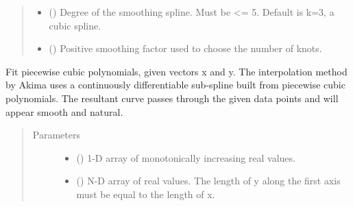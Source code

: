 \documentclass[letterpaper,10pt,english,openany, oneside]{sphinxmanual}
\begin{document}
\begin{fulllineitems}
\begin{quote}
\begin{description}
\begin{itemize}
\item {} 
 () \textendash{} Degree of the smoothing spline. Must be \textless{}= 5.
Default is k=3, a cubic spline.

\item {} 
 () \textendash{} Positive smoothing factor used to choose the number of knots.

\end{itemize}

\end{description}\end{quote}

\begin{fulllineitems}
\label{\detokenize{index:fompy.conditioning.interpolator.akima_interpol}}
Fit piecewise cubic polynomials, given vectors x and y.
The interpolation method by Akima uses a continuously differentiable
sub-spline built from piecewise cubic polynomials. The resultant curve passes
through the given data points and will appear smooth and natural.

\end{fulllineitems}

\begin{quote}\begin{description}
\item[{Parameters}] \leavevmode\begin{itemize}
\item {} 
 (\sphinxstyleliteralemphasis{\sphinxupquote{, }}\sphinxstyleliteralemphasis{\sphinxupquote{ (}}\sphinxstyleliteralemphasis{\sphinxupquote{,}}\sphinxstyleliteralemphasis{\sphinxupquote{)}}) \textendash{} 1-D array of monotonically increasing real values.

\item {} 
 () \textendash{} N-D array of real values. The length of y
along the first axis must be equal to the length of x.


\end{itemize}
\end{description}
\end{quote}
\end{fulllineitems}
\end{document}
